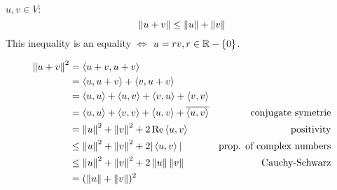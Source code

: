 \setcounter{thm}{13}
\begin{thm}
  $u,v \in V:$
  \begin{equation}
    \norm{u+v} \leq \norm{u} + \norm{v}
  \end{equation}
  This inequality is an equality $\iff$ $u=rv, r\in \real - \{0\}$.
\end{thm}
\begin{prf}
  \begin{equation}
    \begin{aligned}
      \norm{u+v}^2 
      &=    \ip{u+v}{u+v} & \\
      &=    \ip{u}{u+v}+\ip{v}{u+v} & \\
      &=    \ip{u}{u}+\ip{u}{v}+\ip{v}{u}+\ip{v}{v} & \\
      &=    \ip{u}{u}+\ip{v}{v}+\ip{u}{v}+\overline{\ip{u}{v}} & \text{conjugate symetrie}\\
      &=    \norm{u}^2+\norm{v}^2+2\operatorname{Re} \ip{u}{v} & \text{positivity}\\
      &\leq \norm{u}^2+\norm{v}^2+2|\ip{u}{v}| & \text{prop. of complex numbers} \\
      &\leq \norm{u}^2+\norm{v}^2+2\norm{u}\norm{v} & \text{Cauchy-Schwarz} \\
      &=    (\norm{u} + \norm{v})^2 &
    \end{aligned}
  \end{equation}
  \vspace{-1em}
\end{prf}
